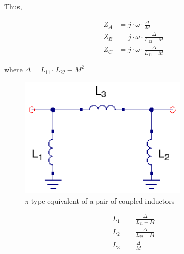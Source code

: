 \noindent Thus,

\begin{align}
   Z_A &= j \cdot \omega \cdot \frac{\Delta}{M} \\
   Z_B &= j \cdot \omega \cdot \frac{\Delta}{L_{22} - M} \\
   Z_C &= j \cdot \omega \cdot \frac{\Delta}{L_{11} - M}
\end{align}

\noindent where $\Delta = L_{11} \cdot L_{22} - M^2$

\begin{figure}[H]
\centering
\includegraphics[width=80mm]{coupled-inductors-pi-equivalent}
\caption{$\pi$-type equivalent of a pair of coupled inductors}
\label{fig:pi-type-coupled-inductor-equivalent}
\end{figure}


\begin{align}
   L_1 &= \frac{\Delta}{L_{11} - M} \\
   L_2 &= \frac{\Delta}{L_{22} - M} \\
   L_3 &= \frac{\Delta}{M}
\end{align}




